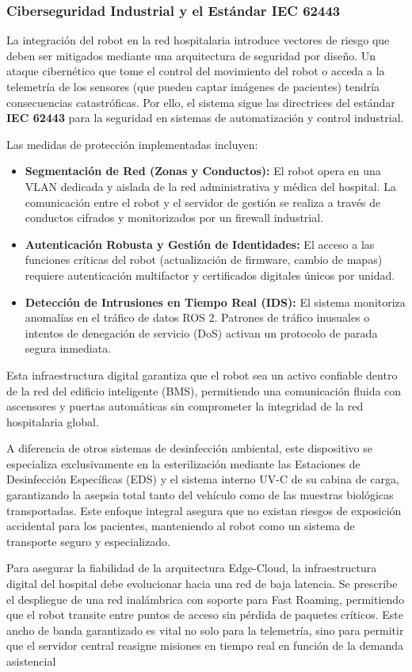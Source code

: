 \subsubsection{Ciberseguridad Industrial y el Estándar IEC 62443}
La integración del robot en la red hospitalaria introduce vectores de riesgo que deben ser mitigados mediante una arquitectura de seguridad por diseño. Un ataque cibernético que tome el control del movimiento del robot o acceda a la telemetría de los sensores (que pueden captar imágenes de pacientes) tendría consecuencias catastróficas. Por ello, el sistema sigue las directrices del estándar \textbf{IEC 62443} para la seguridad en sistemas de automatización y control industrial.

Las medidas de protección implementadas incluyen:
\begin{itemize}
    \item \textbf{Segmentación de Red (Zonas y Conductos):} El robot opera en una VLAN dedicada y aislada de la red administrativa y médica del hospital. La comunicación entre el robot y el servidor de gestión se realiza a través de conductos cifrados y monitorizados por un firewall industrial.
    \item \textbf{Autenticación Robusta y Gestión de Identidades:} El acceso a las funciones críticas del robot (actualización de firmware, cambio de mapas) requiere autenticación multifactor y certificados digitales únicos por unidad.
    \item \textbf{Detección de Intrusiones en Tiempo Real (IDS):} El sistema monitoriza anomalías en el tráfico de datos ROS 2. Patrones de tráfico inusuales o intentos de denegación de servicio (DoS) activan un protocolo de parada segura inmediata.
\end{itemize}

Esta infraestructura digital garantiza que el robot sea un activo confiable dentro de la red del edificio inteligente (BMS), permitiendo una comunicación fluida con ascensores y puertas automáticas sin comprometer la integridad de la red hospitalaria global.

A diferencia de otros sistemas de desinfección ambiental, este dispositivo se especializa exclusivamente en la esterilización mediante las Estaciones de Desinfección Específicas (EDS) y el sistema interno UV-C de su cabina de carga, garantizando la asepsia total tanto del vehículo como de las muestras biológicas transportadas. Este enfoque integral asegura que no existan riesgos de exposición accidental para los pacientes, manteniendo al robot como un sistema de transporte seguro y especializado.

Para asegurar la fiabilidad de la arquitectura Edge-Cloud, la infraestructura digital del hospital debe evolucionar hacia una red de baja latencia. Se prescribe el despliegue de una red inalámbrica con soporte para Fast Roaming, permitiendo que el robot transite entre puntos de acceso sin pérdida de paquetes críticos. Este ancho de banda garantizado es vital no solo para la telemetría, sino para permitir que el servidor central reasigne misiones en tiempo real en función de la demanda asistencial
